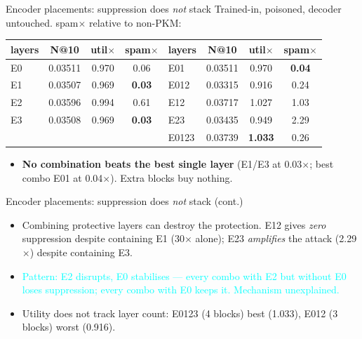\documentclass{beamer}
\newcommand{\pierre}[1]{\textcolor{cyan}{#1}}
\begin{document}
\begin{frame}{Encoder placements: suppression does \emph{not} stack}
Trained-in, poisoned, decoder untouched. spam$\times$ relative to non-PKM:
\begin{center}
\small
\begin{tabular}{|l|c|c|c||l|c|c|c|}
\hline
layers & N@10 & util$\times$ & spam$\times$ & layers & N@10 & util$\times$ & spam$\times$ \\
\hline
E0   & 0.03511 & 0.970 & 0.06 & E01   & 0.03511 & 0.970 & \textbf{0.04} \\
E1   & 0.03507 & 0.969 & \textbf{0.03} & E012  & 0.03315 & 0.916 & 0.24 \\
E2   & 0.03596 & 0.994 & 0.61 & E12   & 0.03717 & 1.027 & \alert{1.03} \\
E3   & 0.03508 & 0.969 & \textbf{0.03} & E23   & 0.03435 & 0.949 & \alert{2.29} \\
     &         &       &      & E0123 & 0.03739 & \textbf{1.033} & 0.26 \\
\hline
\end{tabular}
\end{center}

\begin{itemize}
  \item \textbf{No combination beats the best single layer} (E1/E3 at 0.03$\times$;
        best combo E01 at 0.04$\times$). Extra blocks buy nothing.
\end{itemize}
\end{frame}


\begin{frame}{Encoder placements: suppression does \emph{not} stack (cont.)}
\begin{itemize}
  \item \alert{Combining protective layers can destroy the protection.} E12 gives
        \emph{zero} suppression despite containing E1 (30$\times$ alone); E23
        \emph{amplifies} the attack (2.29$\times$) despite containing E3.
    \item \pierre{Pattern: E2 disrupts, E0 stabilises --- every combo with E2 but
        without E0 loses suppression; every combo with E0 keeps it. Mechanism
        unexplained.}
  \item Utility does not track layer count: E0123 (4 blocks) best (1.033),
        E012 (3 blocks) worst (0.916).
\end{itemize}
\end{frame}
\end{document}
